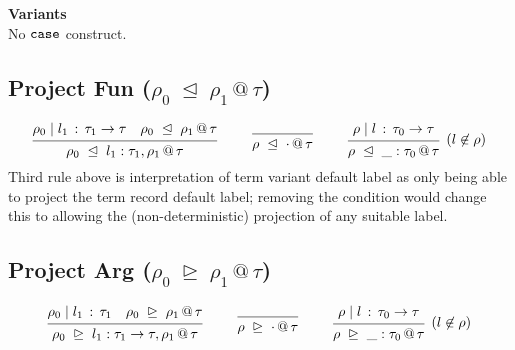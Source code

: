 \documentclass{article}
\makeatletter
\newcommand{\ignore}[1]{}
\newcommand{\define}{::=}
\newcommand{\G}{\Gamma}
\newcommand{\variant}[1]{[\!|#1|\!]}
\newcommand{\hastp}[3]{#1 \vdash #2 \,:\, #3}
\newcommand{\haslbl}[3]{#1\;|\;#2\,:\, #3}
\newcommand{\projFunRule}[3]{#1 \;\trianglelefteq\; #2 \,@\, #3}
\newcommand{\projArgRule}[3]{#1 \;\trianglerighteq\; #2 \,@\, #3}
\newcommand{\deduct}[3][]
{
  \begin{prooftree}
    \hypo{#2}
    \infer1[\text{#1}]{#3}
  \end{prooftree}
}
\makeatother
\begin{document}
\noindent
\textbf{Variants}
\\
No $\tt{case}$ construct.
\\

\subsection{Project Fun \;($\projFunRule{\rho_0}{\rho_1}{\tau}$)}
\label{subsec:case-constraint}
\[
\deduct
    {\haslbl{\rho_0}{l_1}{\tau_1\to\tau} \quad \projFunRule{\rho_0}{\rho_1}{\tau}}
    {\projFunRule{\rho_0}{l_1:\tau_1,\rho_1}{\tau}}
    {}
\qquad
\deduct
    {}
    {\projFunRule{\rho}{\cdot}{\tau}}
    {}
\qquad
\deduct
    {\haslbl{\rho}{l}{\tau_0\to\tau}}
    {\projFunRule{\rho}{\_:\tau_0}{\tau}}
    {(l\not\in\rho)}
\]
Third rule above is interpretation of term variant default label as
only being able to project the term record default label; removing the
condition would change this to allowing the (non-deterministic)
projection of any suitable label.

\subsection{Project Arg \;($\projArgRule{\rho_0}{\rho_1}{\tau}$)}
\label{subsec:case-constraint}
\[
\deduct
    {\haslbl{\rho_0}{l_1}{\tau_1} \quad \projArgRule{\rho_0}{\rho_1}{\tau}}
    {\projArgRule{\rho_0}{l_1:\tau_1\to\tau,\rho_1}{\tau}}
    {}
\qquad
\deduct
    {}
    {\projArgRule{\rho}{\cdot}{\tau}}
    {}
\qquad
\deduct
    {\haslbl{\rho}{l}{\tau_0\to\tau}}
    {\projArgRule{\rho}{\_:\tau_0}{\tau}}
    {(l\not\in\rho)}
\]
\\

\ignore{
\noindent
\textbf{New types}
\[\begin{array}{rcl}
\sigma & \define & \alpha \mid \forall \alpha. \sigma \mid \tau\to\tau
\end{array}
\]

\noindent
\textbf{Records}
\[
\deduct
    {}
    {\hastp{\G}{\{\cdot\}}{\{\cdot\}}}
    {}
\qquad
\deduct
    {\hastp{\G}{e}{\sigma}}
    {\hastp{\G}{\{\_:e\}}{\{\_:\sigma\}}}
    {}
\qquad
\deduct
    {\hastp{\G}{e}{\sigma}
      \quad
      \hastp{\G}{\{r\}}{\{\rho\}}
    }
    {\hastp{\G}{\{l:e,r\}}{\{l:\sigma,\rho\}}}
    {}
\]
}

\end{document}
